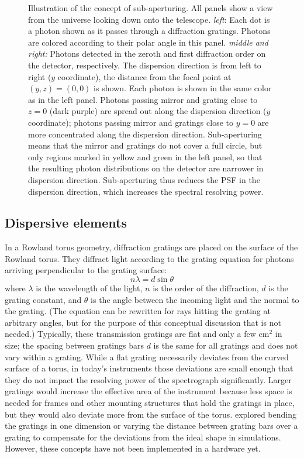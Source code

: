 \documentclass[linenumbers]{aastex631}
\begin{document}
\begin{figure*}
\caption{
    Illustration of the concept of sub-aperturing. All panels show a view from the universe looking down onto the telescope. \emph{left}: Each dot is a photon shown as it passes through a diffraction gratings. Photons are colored according to their polar angle in this panel. \emph{middle and right:} Photons detected in the zeroth and first diffraction order on the detector, respectively. The dispersion direction is from left to right ($y$ coordinate), the distance from the focal point at $(y, z) = (0, 0)$ is shown. Each photon is shown in the same color as in the left panel. Photons passing mirror and grating close to $z=0$ (dark purple) are spread out along the dispersion direction ($y$ coordinate); photons passing mirror and gratings close to $y=0$ are more concentrated along the dispersion direction. Sub-aperturing means that the mirror and gratings do not cover a full circle, but only regions marked in yellow and green in the left panel, so that the resulting photon distributions on the detector are narrower in dispersion direction. Sub-aperturing thus reduces the PSF in the dispersion direction, which increases the spectral resolving power.}
\label{fig:subaperture}
\end{figure*}

\subsection{Dispersive elements}
In a Rowland torus geometry, diffraction gratings are placed on the surface of the Rowland torus. They diffract light according to the grating equation for photons arriving perpendicular to the grating surface:
\begin{equation}
n \lambda = d \sin \theta \label{eqn:diffraction}
\end{equation}
where $\lambda$ is the wavelength of the light, $n$ is the order of the diffraction, $d$ is the grating constant, and $\theta$ is the angle between the incoming light and the normal to the grating. (The equation can be rewritten for rays hitting the grating at arbitrary angles, but for the purpose of this conceptual discussion that is not needed.)
Typically, these transmission gratings are flat and only a few cm$^2$ in size; the spacing between gratings bars $d$ is the same for all gratings and does not vary within a grating. While a flat grating necessarily deviates from the curved surface of a torus, in today's instruments those deviations are small enough that they do not impact the resolving power of the spectrograph significantly. Larger gratings would increase the effective area of the instrument because less space is needed for frames and other mounting structures that hold the gratings in place, but they would also deviate more from the surface of the torus. \citet{2020SPIE11444E..88G} explored bending the gratings in one dimension or varying the distance between grating bars over a grating to compensate for the deviations from the ideal shape in simulations. However, these concepts have not been implemented in a hardware yet.
\end{document}
